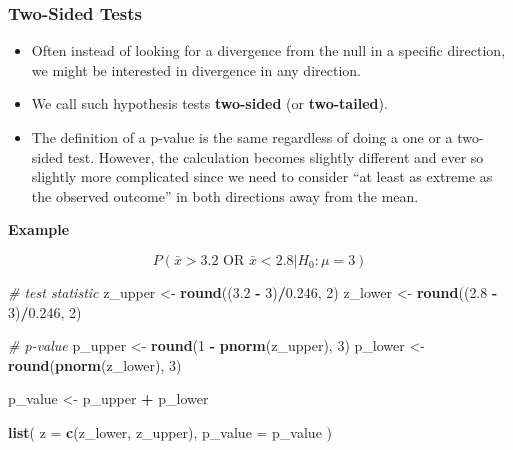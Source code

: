 \documentclass[]{book}
\newenvironment{Shaded}{\begin{snugshade}}{\end{snugshade}}
\newcommand{\CommentTok}[1]{\textcolor[rgb]{0.56,0.35,0.01}{\textit{#1}}}
\newcommand{\DataTypeTok}[1]{\textcolor[rgb]{0.13,0.29,0.53}{#1}}
\newcommand{\DecValTok}[1]{\textcolor[rgb]{0.00,0.00,0.81}{#1}}
\newcommand{\FloatTok}[1]{\textcolor[rgb]{0.00,0.00,0.81}{#1}}
\newcommand{\KeywordTok}[1]{\textcolor[rgb]{0.13,0.29,0.53}{\textbf{#1}}}
\newcommand{\NormalTok}[1]{#1}
\newcommand{\OperatorTok}[1]{\textcolor[rgb]{0.81,0.36,0.00}{\textbf{#1}}}
\newcommand{\StringTok}[1]{\textcolor[rgb]{0.31,0.60,0.02}{#1}}
\providecommand{\tightlist}{%
  \setlength{\itemsep}{0pt}\setlength{\parskip}{0pt}}
\begin{document}
\hypertarget{two-sided-tests}{%
\subsubsection*{Two-Sided Tests}\label{two-sided-tests}}

\begin{itemize}
\tightlist
\item
  Often instead of looking for a divergence from the null in a specific direction, we might be interested
  in divergence in any direction.
\item
  We call such hypothesis tests \textbf{two-sided} (or \textbf{two-tailed}).
\item
  The definition of a p-value is the same regardless of doing a one or a two-sided test. However, the calculation becomes slightly different and ever so slightly more complicated since we need to consider ``at least as extreme as the observed outcome'' in both directions away from the mean.
\end{itemize}

\textbf{Example}

\[
P(\bar{x} > 3.2  \text{ OR }  \bar{x} < 2.8 | H_0 : \mu = 3)
\]

\begin{Shaded}
\begin{Highlighting}[]
\CommentTok{# test statistic}
\NormalTok{z_upper <-}\StringTok{ }\KeywordTok{round}\NormalTok{((}\FloatTok{3.2} \OperatorTok{-}\StringTok{ }\DecValTok{3}\NormalTok{)}\OperatorTok{/}\FloatTok{0.246}\NormalTok{, }\DecValTok{2}\NormalTok{)}
\NormalTok{z_lower <-}\StringTok{ }\KeywordTok{round}\NormalTok{((}\FloatTok{2.8} \OperatorTok{-}\StringTok{ }\DecValTok{3}\NormalTok{)}\OperatorTok{/}\FloatTok{0.246}\NormalTok{, }\DecValTok{2}\NormalTok{)}

\CommentTok{# p-value}
\NormalTok{p_upper <-}\StringTok{ }\KeywordTok{round}\NormalTok{(}\DecValTok{1} \OperatorTok{-}\StringTok{ }\KeywordTok{pnorm}\NormalTok{(z_upper), }\DecValTok{3}\NormalTok{)}
\NormalTok{p_lower <-}\StringTok{ }\KeywordTok{round}\NormalTok{(}\KeywordTok{pnorm}\NormalTok{(z_lower), }\DecValTok{3}\NormalTok{)}

\NormalTok{p_value <-}\StringTok{ }\NormalTok{p_upper }\OperatorTok{+}\StringTok{ }\NormalTok{p_lower}

\KeywordTok{list}\NormalTok{(}
  \DataTypeTok{z =} \KeywordTok{c}\NormalTok{(z_lower, z_upper),}
  \DataTypeTok{p_value =}\NormalTok{ p_value}
\NormalTok{)}
\end{Highlighting}
\end{Shaded}
\end{document}
